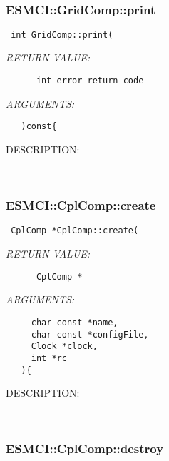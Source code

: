    
 
\mbox{}\hrulefill\
 
\subsubsection [ESMCI::GridComp::print] {ESMCI::GridComp::print}


  
\begin{verbatim} int GridComp::print(\end{verbatim}{\em RETURN VALUE:}
\begin{verbatim}      int error return code\end{verbatim}{\em ARGUMENTS:}
\begin{verbatim}   )const{\end{verbatim}
{\sf DESCRIPTION:\\ }


   
 
\mbox{}\hrulefill\
 
\subsubsection [ESMCI::CplComp::create] {ESMCI::CplComp::create}


  
\begin{verbatim} CplComp *CplComp::create(\end{verbatim}{\em RETURN VALUE:}
\begin{verbatim}      CplComp *\end{verbatim}{\em ARGUMENTS:}
\begin{verbatim}     char const *name,
     char const *configFile,
     Clock *clock,
     int *rc
   ){\end{verbatim}
{\sf DESCRIPTION:\\ }


   
 
\mbox{}\hrulefill\
 
\subsubsection [ESMCI::CplComp::destroy] {ESMCI::CplComp::destroy}


